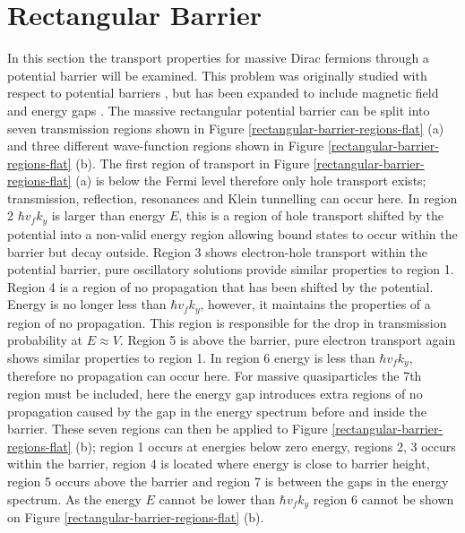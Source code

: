 %
\chapter{Rectangular Barrier}
\label{Rectangular Barrier}
	In this section the transport properties for massive Dirac fermions through a potential barrier will be examined. This problem was originally studied with respect to potential barriers \cite{b12}, but has been expanded to include magnetic field \cite{b14} and energy gaps \cite{b4,b13,b15,b16,b17}. The massive rectangular potential barrier can be split into seven transmission regions shown in Figure \ref{rectangular-barrier-regions-flat} (a) and three different wave-function regions shown in Figure \ref{rectangular-barrier-regions-flat} (b). The first region of transport in Figure \ref{rectangular-barrier-regions-flat} (a) is below the Fermi level therefore only hole transport exists; transmission, reflection, resonances and Klein tunnelling can occur here. In region 2 $\hbar v_{f}k_{y}$ is larger than energy $E$, this is a region of hole transport shifted by the potential into a non-valid energy region allowing bound states to occur within the barrier but decay outside. Region 3 shows electron-hole transport within the potential barrier, pure oscillatory solutions provide similar properties to region 1. Region 4 is a region of no propagation that has been shifted by the potential. Energy is no longer less than $\hbar v_{f}k_{y}$, however, it maintains the properties of a region of no propagation. This region is responsible for the drop in transmission probability at $E\approx V$. Region 5 is above the barrier, pure electron transport again shows similar properties to region 1. In region 6 energy is less than $\hbar v_{f}k_{y}$, therefore no propagation can occur here. For massive quasiparticles the 7th region must be included, here the energy gap introduces extra regions of no propagation caused by the gap in the energy spectrum before and inside the barrier. These seven regions can then be applied to Figure \ref{rectangular-barrier-regions-flat} (b); region 1 occurs at energies below zero energy, regions 2, 3 occurs within the barrier, region 4 is  located where energy is close to barrier height, region 5 occurs above the barrier and region 7 is between the gaps in the energy spectrum. As the energy $E$ cannot be lower than $\hbar v_{f}k_{y}$ region 6 cannot be shown on Figure \ref{rectangular-barrier-regions-flat} (b).
